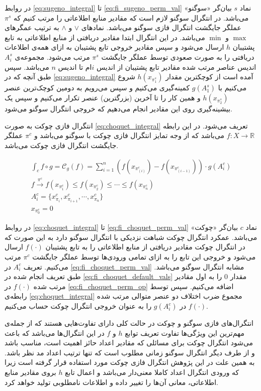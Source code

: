در روابط
\ref{eq:sugeno_integral} تا \ref{eq:fi_sugeno_perm_val}
نماد $s$ بیان‌گر «سوگنو» می‌‌باشد. در انتگرال‌ سوگنو لازم است که مقادیر منابع اطلاعاتی را مرتب کنیم که $\pi^s$ عملگر جایگشت انتگرال فازی سوگنو می‌باشد. نمادهای $\vee$ و $\wedge$ به ترتیب عمگرهای $\max$ و $\min$ می‌باشد. در این انتگرال ابتدا مقادیر دریافتی از منابع اطلاعاتی به تابع پشتیبان $h$ ارسال می‌شود و سپس مقادیر خروجی تابع پشتیبان به ازای همه‌ی اطلاعات دریافتی را به صورت صعودی توسط عملگر جایگشت $\pi^s$ مرتب می‌شود. مجموعه‌ی $A_i^s$ اندیس عناصر مرتب شده مقادیر تابع پشتیبان از اندیس $i$ام تا اندیس $n$ می‌باشد. سپس طبق آنچه که در \ref{eq:sugeno_integral} آمده است از کوچکترین مقدار $h(x_{\pi_1^s})$ شروع می‌کنیم با $g(A_1^s)$ کمینه‌گیری می‌کنیم و سپس می‌رویم به دومین کوچک‌ترین عنصر $h(x_{\pi_2^s})$ و همین کار را تا آخرین (بزرگترین) عنصر تکرار می‌کنیم و سپس یک بیشینه‌گیری روی این مقادیر انجام می‌دهیم که خروجی انتگرال سوگنو می‌شود.

انتگرال فازی چوکت به صورت \ref{eq:choquet_integral} تعریف می‌شود. در این رابطه
$f : X \rightarrow \mathbb{R}$
می‌باشد که از وجه تمایز انتگرال فازی چوکت با سوگنو می‌‌باشد و $\pi^c$ عملگر جایگشت انتگرال فازی چوکت می‌باشد.

\begin{eqnarray}
\int_{c} f \circ g = \mathcal{C}_g(f) = \sum_{i = 1}^{n} \left( f(x_{\pi_{(i)}^c}) - f(x_{\pi_{(i-1)}^c}) \right) \cdot g(A_i^c)\label{eq:choquet_integral}\\
f \xrightarrow{\pi^c} f(x_{\pi_1^c}) \leq f(x_{\pi_2^c}) \leq \cdots \leq f(x_{\pi_n^c})\label{eq:fi_choquet_perm_op}\\
A_i^c = \{x_{\pi_i}^c, x_{\pi_{i+1}}^c, \cdots, x_{\pi_n}^c\}\label{eq:fi_choquet_perm_val}\\
x_{\pi^c_0} = 0\label{eq:fi_choquet_default_vals}
\end{eqnarray}

در روابط
\ref{eq:choquet_integral} تا \ref{eq:fi_choquet_perm_val}
نماد $c$ بیان‌گر «چوکت» می‌‌باشد. عمکرد انتگرال چوکت شباهت نزدیکی با انتگرال سوگنو دارد به این صورت که در انتگرال چوکت مقادیر دریافتی از منابع اطلاعاتی را به تابع پشتیبان $f(\cdot)$ ارسال می‌شود و خروجی این تابع را به ازای تمامی ورودی‌ها توسط عملگر جایگشت $\pi^c$ مرتب می‌کنیم. تعریف $A_i^c$ در \ref{eq:fi_choquet_perm_val} مشابه انتگرال سوگنو می‌باشد. طبق تعریف انجام شده در \ref{eq:fi_choquet_default_vals} مقدار 0 را به اول مقادیر مرتب شده $f(\cdot)$ در \ref{eq:fi_choquet_perm_op} اضافه می‌کنیم. سپس توسط رابطه‌ی \ref{eq:choquet_integral} مجموع ضرب اختلاف دو عنصر متوالی مرتب شده $f(\cdot)$ در $g(A_i^c)$ را به عنوان خروجی انتگرال چوکت حساب می‌کنیم.

انتگرال‌های فازی سوگنو و چوکت در حالت کلی دارای تفاوت‌هایی هستند که از جمله‌ی مهم‌ترین این ویژگی‌ها تفاوت تعریف توابع $h$ و $f$ در این انتگرال‌ها می‌باشد که باعث می‌شود انتگرال چوکت برای مسائلی که مقادیر اعداد حائز اهمیت است، مناسب باشد و از طرف دیگر انتگرال سوگنو زمانی مطلوب است که تنها ترتیب اعداد مد نظر باشد. به همین علت در این پژوهش انتگرال فازی چوکت مورد استفاده قرار گرفته است زیرا که ورودی انتگرال اعداد کاملا معنی‌دار می‌باشد و اعمال تابع $h$ بروی مقادیر منابع اطلاعاتی، معانی آن‌ها را تغییر داده و اطلاعات نامطلوبی تولید خواهد کرد.
